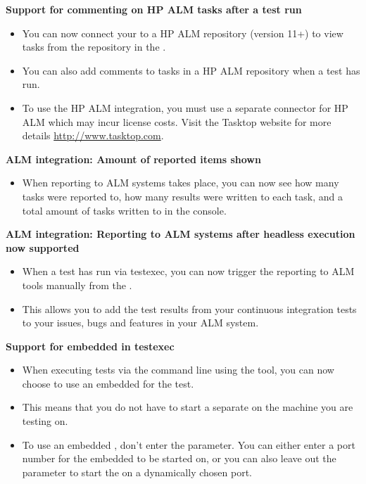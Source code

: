 \textbf{Support for commenting on HP ALM tasks after a test run}
\begin{itemize}
\item You can now connect your \ite{} to a HP ALM repository (version 11+) to view tasks from the repository in the \ite{}.
\item You can also add comments to tasks in a HP ALM repository when a test has run.
\item To use the HP ALM integration, you must use a separate connector for HP ALM which may incur license costs. Visit the Tasktop website for more details \url{http://www.tasktop.com}.
\end{itemize} 

\textbf{ALM integration: Amount of reported items shown}
\begin{itemize}
\item When reporting to ALM systems takes place, you can now see how many tasks were reported to, how many results were written to each task, and a total amount of tasks written to in the console.
\end{itemize}

\textbf{ALM integration: Reporting to ALM systems after headless execution now supported}
\begin{itemize}
\item When a test has run via testexec, you can now trigger the reporting to ALM tools manually from the \gdtestsummaryview{}. 
\item This allows you to add the test results from your continuous integration tests to your issues, bugs and features in your ALM system. 
\end{itemize}

\textbf{Support for embedded \gdagent{} in testexec}
\begin{itemize}
\item When executing tests via the command line using the  tool, you can now choose to use an embedded \gdagent{} for the test.
\item This means that you do not have to start a separate \gdagent{} on the machine you are testing on.
\item To use an embedded \gdagent{}, don't enter the  parameter. You can either enter a port number for the embedded \gdagent{} to be started on, or you can also leave out the  parameter to start the \gdagent{} on a dynamically chosen port.
\end{itemize}

